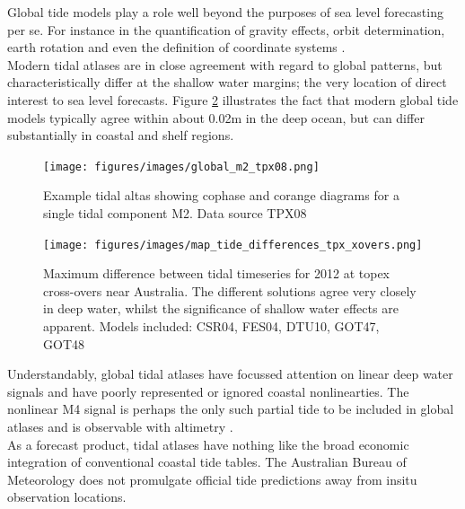 Global tide models play a role well beyond the purposes of sea level forecasting per se.  For instance in the quantification of gravity effects, orbit determination, earth rotation and even the definition of coordinate systems \citep{Anonymous:2004tm}.\\


Modern tidal atlases are in close agreement with regard to global patterns, but characteristically differ at the shallow water margins; the very location of direct interest to sea level forecasts.  Figure \ref{fig:tpx_cross} illustrates the fact that modern global tide models typically agree within about 0.02m in the deep ocean, but can differ substantially in coastal and shelf regions. 


\begin{figure}[h]
\begin{center}
\texttt{[image: figures/images/global\_m2\_tpx08.png]}
\caption{Example tidal altas showing cophase and corange diagrams for a single tidal component M2.  Data source TPX08 \cite{Egbert:2002ug}  }
\label{fig:atlas}
\end{center}
\end{figure}


\begin{figure}[h]
\begin{center}
\texttt{[image: figures/images/map\_tide\_differences\_tpx\_xovers.png]}
\caption{Maximum difference between tidal timeseries for 2012 at topex cross-overs near Australia.  The different solutions agree very closely in deep water, whilst the significance of shallow water effects are apparent.  Models included: CSR04\citep{Eanes:1996tr}, FES04\citep{Lyard:2006ir}, DTU10\citep{IMPROVEMENTOFGLOBA:2010tu}, GOT47, GOT48\citep{Schrama:1994vr}\citep{Ray:1999vm} }
\label{fig:tpx_cross}
\end{center}
\end{figure}


Understandably, global tidal atlases have focussed attention on linear deep water signals and have poorly represented or ignored coastal nonlinearties.  The nonlinear M4 signal is perhaps the only such partial tide to be included in global atlases and is observable with altimetry \cite{Ray:2010jm}.\\



As a forecast product, tidal atlases have nothing like the broad economic integration of conventional coastal tide tables.  The Australian Bureau of Meteorology does not promulgate official tide predictions away from insitu observation locations. \\





